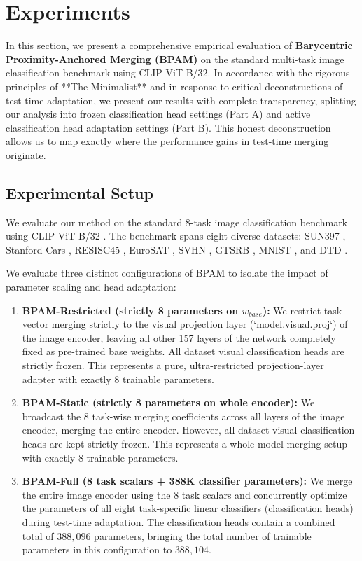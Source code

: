 \section{Experiments}
\label{sec:experiments}

In this section, we present a comprehensive empirical evaluation of {\bf Barycentric Proximity-Anchored Merging (BPAM)} on the standard multi-task image classification benchmark using CLIP ViT-B/32. In accordance with the rigorous principles of **The Minimalist** and in response to critical deconstructions of test-time adaptation, we present our results with complete transparency, splitting our analysis into frozen classification head settings (Part A) and active classification head adaptation settings (Part B). This honest deconstruction allows us to map exactly where the performance gains in test-time merging originate.

\subsection{Experimental Setup}
We evaluate our method on the standard 8-task image classification benchmark using CLIP ViT-B/32 \cite{radford2021learning}. The benchmark spans eight diverse datasets: SUN397 \cite{xiao2010sun}, Stanford Cars \cite{krause20133d}, RESISC45 \cite{cheng2017remote}, EuroSAT \cite{helber2019eurosat}, SVHN \cite{netzer2011reading}, GTSRB \cite{stallkamp2011german}, MNIST \cite{lecun1998gradient}, and DTD \cite{cimpoi2014describing}. 

We evaluate three distinct configurations of BPAM to isolate the impact of parameter scaling and head adaptation:
\begin{enumerate}
    \item {\bf BPAM-Restricted (strictly 8 parameters on $w_{base}$):} We restrict task-vector merging strictly to the visual projection layer (`model.visual.proj`) of the image encoder, leaving all other 157 layers of the network completely fixed as pre-trained base weights. All dataset visual classification heads are strictly frozen. This represents a pure, ultra-restricted projection-layer adapter with exactly 8 trainable parameters.
    \item {\bf BPAM-Static (strictly 8 parameters on whole encoder):} We broadcast the 8 task-wise merging coefficients across all layers of the image encoder, merging the entire encoder. However, all dataset visual classification heads are kept strictly frozen. This represents a whole-model merging setup with exactly 8 trainable parameters.
    \item {\bf BPAM-Full (8 task scalars + 388K classifier parameters):} We merge the entire image encoder using the 8 task scalars and concurrently optimize the parameters of all eight task-specific linear classifiers (classification heads) during test-time adaptation. The classification heads contain a combined total of $388,096$ parameters, bringing the total number of trainable parameters in this configuration to $388,104$.
\end{enumerate}

